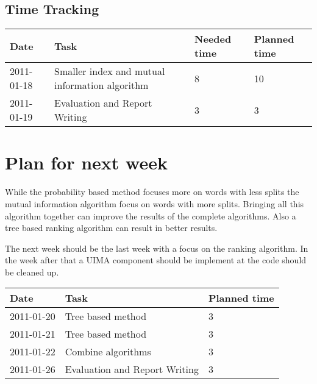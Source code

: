 \documentclass[11pt, accentcolor=tud9b, nochapname]{tudexercise}
\begin{document}
\subsection{Time Tracking}

\begin{tabular}{l | l | l | l}
  \hline
  \textbf{Date} & \textbf{Task} & \textbf{Needed time} & \textbf{Planned time} \\ \hline
  2011-01-18 & Smaller index and mutual information algorithm & 8 & 10 \\ \hline
  2011-01-19 & Evaluation and Report Writing & 3 & 3 \\ \hline
\end{tabular}

\section{Plan for next week}
While the probability based method focuses more on words with less splits the mutual information algorithm focus on words with more splits. Bringing all this algorithm together can improve the results of the complete algorithms.
Also a tree based ranking algorithm can result in better results.

The next week should be the last week with a focus on the ranking algorithm. In the week after that a UIMA component should be implement at the code should be cleaned up.

\vspace{10pt}
\begin{tabular}{l | l | l}
  \hline
  \textbf{Date} & \textbf{Task} & \textbf{Planned time} \\ \hline
  2011-01-20 & Tree based method & 3 \\ \hline
  2011-01-21 & Tree based method & 3 \\ \hline
  2011-01-22 & Combine algorithms & 3 \\ \hline
  2011-01-26 & Evaluation and Report Writing & 3 \\ \hline
\end{tabular}
\end{document}
